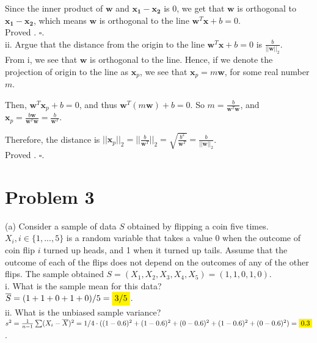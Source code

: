 \documentclass[12pt]{article}
\begin{document}
Since the inner product of $\mathbf {w}$ and $\mathbf{x_1} - \mathbf{x_2}$ is 0, we get that $\mathbf {w}$ is orthogonal to $\mathbf{x_1} - \mathbf{x_2}$, which means $\mathbf {w}$ is orthogonal to the line $\mathbf{w}^T\mathbf{x} + b = 0$.\\

Proved . $\square$.\\

ii. Argue that the distance from the origin to the line $\mathbf{w}^T\mathbf{x}+b = 0$ is $\frac{b}{||\mathbf{w}||_2}$.\\

From i, we see that $\mathbf{w}$ is orthogonal to the line. Hence, if we denote the projection of origin to the line as $\mathbf{x}_p$, we see that $\mathbf{x}_p = m \mathbf{w}$, for some real number $m$.

Then, $\mathbf{w}^T\mathbf{x}_p + b = 0$, and thus $\mathbf{w}^T(m\mathbf{w}) + b = 0$. So $m = \frac{b}{\mathbf{w}^T\mathbf{w}}$, and $\mathbf{x}_p = \frac{b\mathbf{w}}{\mathbf{w}^T\mathbf{w}} = \frac{b}{\mathbf{w}^T}$.

Therefore, the distance is $||\mathbf{x}_p||_2 = ||\frac{b}{\mathbf{w}^T}||_2 = \sqrt{\frac{b^2}{\mathbf{w}^T}} = \frac{b}{||\mathbf{w}||_2}$.\\

Proved . $\square$.

\section*{Problem 3}

(a) Consider a sample of data $S$ obtained by flipping a coin five times. $X_i,i \in \{1,...,5\}$ is a random variable that takes a value 0 when the outcome of coin flip $i$ turned up heads, and 1 when it turned up tails. Assume that the outcome of each of the flips does not depend on the outcomes of any of the other flips. The sample obtained $S = (X_1, X_2, X_3, X_4, X_5) = (1,1,0,1,0)$.\\

i. What is the sample mean for this data?\\

$\overline{S} = (1+1+0+1+0) / 5 = \colorbox{yellow}{3/5}$.\\

ii. What is the unbiased sample variance?\\

$s^2 = \frac{1}{n-1}\sum (X_i-\overline{X})^2 = 1/4 \cdot ((1 - 0.6)^2 + (1 - 0.6)^2 + (0 - 0.6)^2 + (1 - 0.6)^2 + (0 - 0.6)^2) = \colorbox{yellow}{0.3}$.\\
\end{document}
